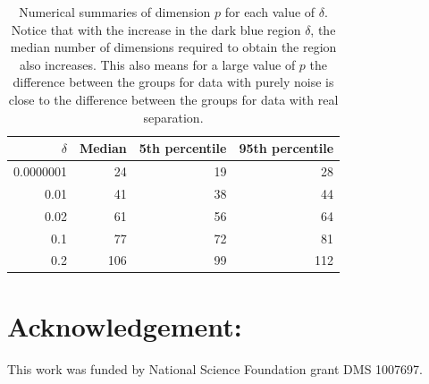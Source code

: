 \begin{table}[htbp]
\begin{center}
\caption{Numerical summaries of dimension $p$ for each value of $\delta$. Notice that with the increase in the dark blue region $\delta$, the median number of dimensions required to obtain the region also increases. This also means for a large value of $p$ the difference between the groups for data with purely noise is close to the difference between the groups for data with real separation. }
\begin{tabular}{rrrr}
  \hline
  \hline
  $\delta$ & Median & 5th percentile & 95th percentile \\
  \hline
  0.0000001 & 24 & 19 & 28 \\
      0.01 & 41 & 38 & 44\\
   0.02 & 61 & 56 & 64 \\
     0.1 & 77 & 72 & 81\\   
     0.2 & 106 & 99 & 112\\ 
      \hline
\end{tabular}
\label{tab:dimen}
\end{center}
\end{table}



\section{Acknowledgement:}
%
This work was funded by National Science Foundation grant DMS 1007697.

%




